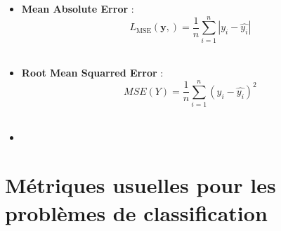 \begin{itemize}

    \item \textbf{Mean Absolute Error} : 
        \begin{equation}
            L_{\text{MSE}}(\boldsymbol{y}, ) = \frac{1}{n}\sum_{i = 1}^{n}|y_{i} - \hat{y_{i}}|
        \end{equation} \\
    \item \textbf{Root Mean Squarred Error} : 
        \begin{equation}
            MSE(Y) = \frac{1}{n}\sum_{i = 1}^{n}(y_{i} - \hat{y_{i}})^{2}
        \end{equation} \\

    \item 
\end{itemize}

\section{Métriques usuelles pour les problèmes de classification}

